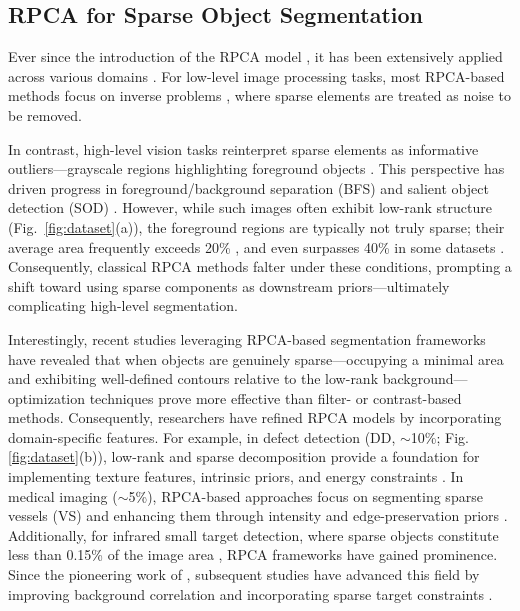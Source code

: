 \documentclass[10pt,journal,compsoc]{IEEEtran}
\begin{document}
\subsection{RPCA for Sparse Object Segmentation}
Ever since the introduction of the RPCA model \cite{wright-2009-robust}, it has been extensively applied across various domains \cite{bouwmans-2018-rpca}. For low-level image processing tasks, most RPCA-based methods focus on inverse problems \cite{liu2020smooth,chang2020weighted,zhou2014low}, where sparse elements are treated as noise to be removed.

In contrast, high-level vision tasks reinterpret sparse elements as informative outliers—grayscale regions highlighting foreground objects \cite{jou-2024-rpca}. This perspective has driven progress in foreground/background separation (BFS) \cite{liu-2015-background,Ebadi2018foreground,Javed2017foreground} and salient object detection (SOD) \cite{shen2012unified,peng2016salient,borji2019salient}. However, while such images often exhibit low-rank structure (Fig.~\ref{fig:dataset}(a)), the foreground regions are typically not truly sparse; their average area frequently exceeds 20\% \cite{li2014secrets,fan2018salient,jiang2013msrab}, and even surpasses 40\% in some datasets \cite{zhang2015salient,wang2021salient}. Consequently, classical RPCA methods falter under these conditions, prompting a shift toward using sparse components as downstream priors—ultimately complicating high-level segmentation.


Interestingly, recent studies leveraging RPCA-based segmentation frameworks have revealed that when objects are genuinely sparse—occupying a minimal area and exhibiting well-defined contours relative to the low-rank background—optimization techniques prove more effective than filter- or contrast-based methods. Consequently, researchers have refined RPCA models by incorporating domain-specific features. For example, in defect detection (DD, $\sim$10\%; Fig. \ref{fig:dataset}(b)), low-rank and sparse decomposition provide a foundation for implementing texture features, intrinsic priors, and energy constraints \cite{song-2020-MCITF,wang-2020-defect,ahmed2020sparse,qin2024metallic}. In medical imaging ($\sim$5\%), RPCA-based approaches focus on segmenting sparse vessels (VS) and enhancing them through intensity and edge-preservation priors \cite{lee-2018-rpca,qin2019accurate,FU-20201-cdrpca}. Additionally, for infrared small target detection, where sparse objects constitute less than 0.15\% of the image area \cite{ying-2025-rgbt-tiny}, RPCA frameworks have gained prominence. Since the pioneering work of \cite{gao-2013-ipi}, subsequent studies have advanced this field by improving background correlation \cite{wang-2017-tvpcp,liu-2021-asttv,wu-2023-4d} and incorporating sparse target constraints \cite{dai-2017-ript,zhang-2019-pstnn,kong-2022-logtfnn}.
\end{document}

